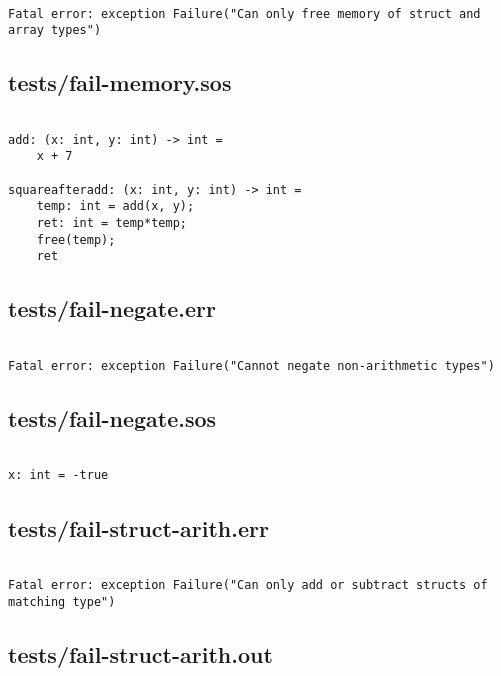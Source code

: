 \documentclass[main.tex]{subfiles}
\begin{document}
\begin{lstlisting}

Fatal error: exception Failure("Can only free memory of struct and array types")
\end{lstlisting}

\subsection{tests/fail-memory.sos}

\begin{lstlisting}

add: (x: int, y: int) -> int = 
    x + 7

squareafteradd: (x: int, y: int) -> int =
    temp: int = add(x, y);
    ret: int = temp*temp;
    free(temp);
    ret
\end{lstlisting}

\subsection{tests/fail-negate.err}

\begin{lstlisting}

Fatal error: exception Failure("Cannot negate non-arithmetic types")
\end{lstlisting}

\subsection{tests/fail-negate.sos}

\begin{lstlisting}

x: int = -true
\end{lstlisting}

\subsection{tests/fail-struct-arith.err}

\begin{lstlisting}

Fatal error: exception Failure("Can only add or subtract structs of matching type")
\end{lstlisting}

\subsection{tests/fail-struct-arith.out}
\end{document}
